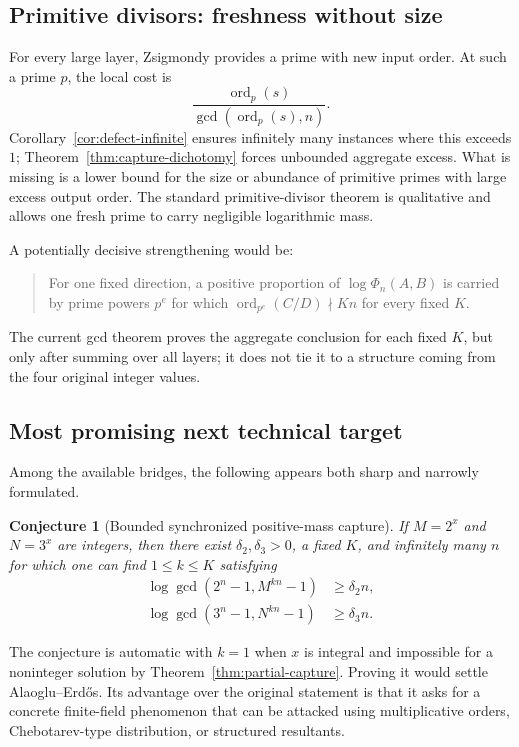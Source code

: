 \documentclass[11pt,oneside]{article}
\newtheorem{conjecture}[theorem]{Conjecture}
\theoremstyle{definition}
\theoremstyle{remark}
\newcommand{\ord}{\operatorname{ord}}
\newcommand{\AEconj}{Alaoglu--Erd\H{o}s}
\begin{document}
\subsection{Primitive divisors: freshness without size}

For every large layer, Zsigmondy provides a prime with new input order.  At such a prime $p$,
the local cost is
\[
 \frac{\ord_p(s)}{\gcd(\ord_p(s),n)}.
\]
Corollary~\ref{cor:defect-infinite} ensures infinitely many instances where this exceeds $1$;
Theorem~\ref{thm:capture-dichotomy} forces unbounded aggregate excess.  What is missing is a
lower bound for the size or abundance of primitive primes with large excess output order.
The standard primitive-divisor theorem is qualitative and allows one fresh prime to carry
negligible logarithmic mass.

A potentially decisive strengthening would be:
\begin{quote}
For one fixed direction, a positive proportion of
$\log\Phi_n(A,B)$ is carried by prime powers $p^e$ for which
$\ord_{p^e}(C/D)\nmid Kn$ for every fixed $K$.
\end{quote}
The current gcd theorem proves the aggregate conclusion for each fixed $K$, but only after
summing over all layers; it does not tie it to a structure coming from the four original
integer values.

\subsection{Most promising next technical target}

Among the available bridges, the following appears both sharp and narrowly formulated.

\begin{conjecture}[Bounded synchronized positive-mass capture]
\label{conj:bounded-capture}
If $M=2^x$ and $N=3^x$ are integers, then there exist
$\delta_2,\delta_3>0$, a fixed $K$, and infinitely many $n$ for which one can find
$1\le k\le K$ satisfying
\begin{align*}
 \log\gcd(2^n-1,M^{kn}-1)&\ge\delta_2n,\\
 \log\gcd(3^n-1,N^{kn}-1)&\ge\delta_3n.
\end{align*}
\end{conjecture}

The conjecture is automatic with $k=1$ when $x$ is integral and impossible for a noninteger
solution by Theorem~\ref{thm:partial-capture}.  Proving it would settle \AEconj{}.  Its advantage
over the original statement is that it asks for a concrete finite-field phenomenon that can
be attacked using multiplicative orders, Chebotarev-type distribution, or structured
resultants.
\end{document}
